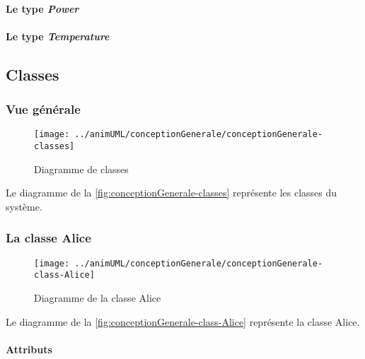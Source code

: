 \paragraph{Le type \emph{Power}}


\paragraph{Le type \emph{Temperature}}



\subsection{Classes}

\subsubsection{Vue générale}

\begin{figure}[H]
	\centering
	\texttt{[image: ../animUML/conceptionGenerale/conceptionGenerale-classes]}
	\caption{Diagramme de classes}
	\label{fig:conceptionGenerale-classes}
\end{figure}
Le diagramme de la \autoref{fig:conceptionGenerale-classes} représente les classes du système.


\subsubsection{La classe Alice}

\begin{figure}[H]
	\centering
	\texttt{[image: ../animUML/conceptionGenerale/conceptionGenerale-class-Alice]}
	\caption{Diagramme de la classe Alice}
	\label{fig:conceptionGenerale-class-Alice}
\end{figure}
Le diagramme de la \autoref{fig:conceptionGenerale-class-Alice} représente la classe Alice.


\paragraph{Attributs}
\classAliceProperties
